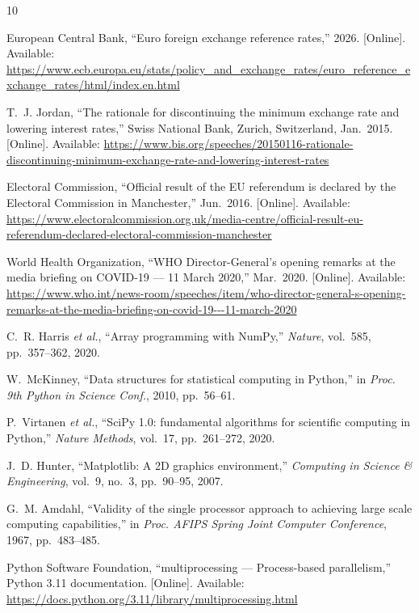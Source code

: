 \documentclass[journal]{IEEEtran}
\begin{document}
\begin{thebibliography}{10}

European Central Bank, ``Euro foreign exchange reference rates,'' 2026. [Online]. Available: \url{https://www.ecb.europa.eu/stats/policy_and_exchange_rates/euro_reference_exchange_rates/html/index.en.html}

T.~J. Jordan, ``The rationale for discontinuing the minimum exchange rate and lowering interest rates,'' Swiss National Bank, Zurich, Switzerland, Jan.~2015. [Online]. Available: \url{https://www.bis.org/speeches/20150116-rationale-discontinuing-minimum-exchange-rate-and-lowering-interest-rates}

Electoral Commission, ``Official result of the EU referendum is declared by the Electoral Commission in Manchester,'' Jun.~2016. [Online]. Available: \url{https://www.electoralcommission.org.uk/media-centre/official-result-eu-referendum-declared-electoral-commission-manchester}

World Health Organization, ``WHO Director-General's opening remarks at the media briefing on COVID-19 --- 11 March 2020,'' Mar.~2020. [Online]. Available: \url{https://www.who.int/news-room/speeches/item/who-director-general-s-opening-remarks-at-the-media-briefing-on-covid-19---11-march-2020}

C.~R. Harris \emph{et al.}, ``Array programming with NumPy,'' \emph{Nature}, vol.~585, pp.~357--362, 2020.

W.~McKinney, ``Data structures for statistical computing in Python,'' in \emph{Proc. 9th Python in Science Conf.}, 2010, pp.~56--61.

P.~Virtanen \emph{et al.}, ``SciPy 1.0: fundamental algorithms for scientific computing in Python,'' \emph{Nature Methods}, vol.~17, pp.~261--272, 2020.

J.~D. Hunter, ``Matplotlib: A 2D graphics environment,'' \emph{Computing in Science \& Engineering}, vol.~9, no.~3, pp.~90--95, 2007.

G.~M. Amdahl, ``Validity of the single processor approach to achieving large scale computing capabilities,'' in \emph{Proc. AFIPS Spring Joint Computer Conference}, 1967, pp.~483--485.

Python Software Foundation, ``multiprocessing --- Process-based parallelism,'' Python 3.11 documentation. [Online]. Available: \url{https://docs.python.org/3.11/library/multiprocessing.html}

\end{thebibliography}
\end{document}
